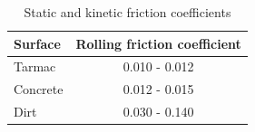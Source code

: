 \begin{table}[h!]
  \begin{center}
    \begin{tabular}{ l | c }
      \toprule
      \textbf{Surface} & \textbf{Rolling friction coefficient} \\ \midrule
      Tarmac   &  0.010 - 0.012 \\
      Concrete &  0.012 - 0.015 \\
      Dirt     &  0.030 - 0.140 \\
      \bottomrule
    \end{tabular}
    \caption{Static and kinetic friction coefficients \cite{Studzinski1980} }
  \end{center}
\end{table}
